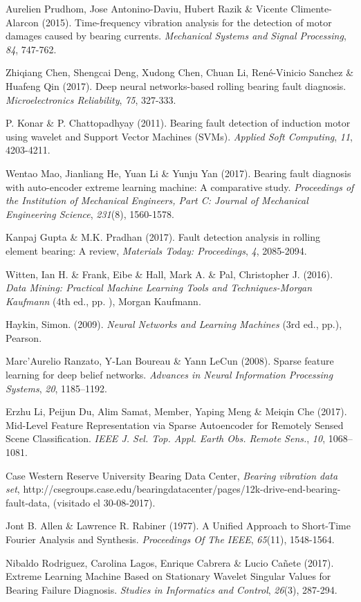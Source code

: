 \documentclass[12pt]{article}%
\begin{document}
\begin{thebibliography}{9}
 Aurelien Prudhom, Jose Antonino-Daviu, Hubert Razik \& Vicente Climente-Alarcon (2015). Time-frequency vibration analysis for the detection of motor damages caused by bearing currents. \textit{Mechanical Systems and Signal Processing}, \textit{84}, 747-762.

 Zhiqiang Chen, Shengcai Deng, Xudong Chen, Chuan Li, René-Vinicio Sanchez \& Huafeng Qin (2017). Deep neural networks-based rolling bearing fault diagnosis. \textit{Microelectronics Reliability}, \textit{75}, 327-333.

 P. Konar \& P. Chattopadhyay (2011). Bearing fault detection of induction motor using wavelet and Support Vector Machines (SVMs). \textit{Applied Soft Computing}, \textit{11}, 4203-4211.

 Wentao Mao, Jianliang He, Yuan Li \& Yunju Yan (2017). Bearing fault diagnosis with auto-encoder extreme learning machine: A comparative study. \textit{Proceedings of the Institution of Mechanical Engineers, Part C: Journal of Mechanical Engineering Science}, \textit{231}(8), 1560-1578.

 Kanpaj Gupta \& M.K. Pradhan (2017). Fault detection analysis in rolling element bearing: A review, \textit{Materials Today: Proceedings}, \textit{4}, 2085-2094.

 Witten, Ian H. \& Frank, Eibe \& Hall, Mark A. \& Pal, Christopher J. (2016). \textit{Data Mining: Practical Machine Learning Tools and Techniques-Morgan Kaufmann} (4th ed., pp. ), Morgan Kaufmann.

 Haykin, Simon. (2009). \textit{Neural Networks and Learning Machines} (3rd ed., pp.), Pearson.

 Marc’Aurelio Ranzato, Y-Lan Boureau \& Yann LeCun (2008). Sparse feature learning for deep belief networks. \textit{Advances in Neural Information Processing Systems}, \textit{20}, 1185–1192.

 Erzhu Li, Peijun Du, Alim Samat, Member, Yaping Meng \& Meiqin Che (2017). Mid-Level Feature Representation via Sparse Autoencoder for Remotely Sensed Scene Classification. \textit{IEEE J. Sel. Top. Appl. Earth Obs. Remote Sens.}, \textit{10}, 1068–1081.

 Case Western Reserve University Bearing Data Center, \textit{Bearing vibration data set}, http://csegroups.case.edu/bearingdatacenter/pages/12k-drive-end-bearing-fault-data, (visitado el 30-08-2017).

 Jont B. Allen \& Lawrence R. Rabiner (1977). A Unified Approach to Short-Time Fourier Analysis
and Synthesis. \textit{Proceedings Of The IEEE}, \textit{65}(11), 1548-1564.

 Nibaldo Rodriguez, Carolina Lagos, Enrique Cabrera \& Lucio Cañete (2017). Extreme Learning Machine Based on Stationary Wavelet Singular Values for Bearing Failure Diagnosis. \textit{Studies in Informatics and Control}, \textit{26}(3), 287-294.

\end{thebibliography}
\end{document}
